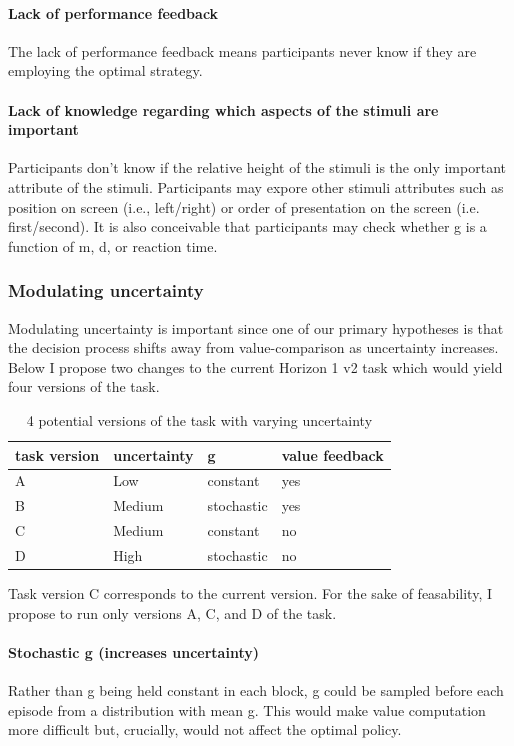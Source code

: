 \documentclass[11pt]{article}
\begin{document}
\paragraph{Lack of performance feedback}
\label{sec:org6848ba5}
The lack of performance feedback means participants never know if they are employing the optimal strategy.
\paragraph{Lack of knowledge regarding which aspects of the stimuli are important}
\label{sec:org947c492}
Participants don't know if the relative height of the stimuli is the only important attribute of the stimuli. Participants may expore other stimuli attributes such as position on screen (i.e., left/right) or order of presentation on the screen (i.e. first/second). It is also conceivable that participants may check whether g is a function of m, d, or reaction time.
\subsubsection{Modulating uncertainty}
\label{sec:org02427c8}
Modulating uncertainty is important since one of our primary hypotheses is that the decision process shifts away from value-comparison as uncertainty increases. Below I propose two changes to the current Horizon 1 v2 task which would yield four versions of the task.

\begin{table}[htbp]
\caption{\label{task_versions}4 potential versions of the task with varying uncertainty}
\centering
\begin{tabular}{llll}
task version & uncertainty & g & value feedback\\
\hline
A & Low & constant & yes\\
B & Medium & stochastic & yes\\
C & Medium & constant & no\\
D & High & stochastic & no\\
\end{tabular}
\end{table}
Task version C corresponds to the current version. For the sake of feasability, I propose to run only versions A, C, and D of the task.
\paragraph{Stochastic g (increases uncertainty)}
\label{sec:org224872c}
Rather than g being held constant in each block, g could be sampled before each episode from a distribution with mean g. This would make value computation more difficult but, crucially, would not affect the optimal policy.
\end{document}
